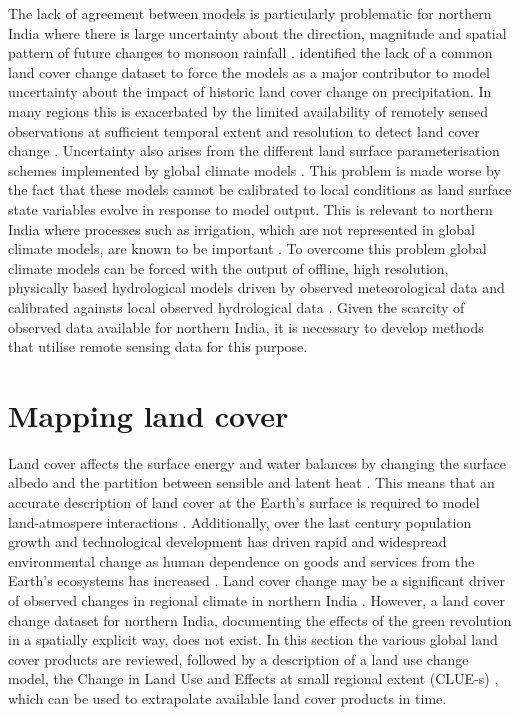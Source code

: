 \documentclass{icldt}\usepackage[]{graphicx}\usepackage[]{color}
\begin{document}
The lack of agreement between models is particularly problematic for northern India where there is large uncertainty about the direction, magnitude and spatial pattern of future changes to monsoon rainfall \citep{Goswami2006,Turner2009}. \citet{Pitman2009} identified the lack of a common land cover change dataset to force the models as a major contributor to model uncertainty about the impact of historic land cover change on precipitation. In many regions this is exacerbated by the limited availability of remotely sensed observations at sufficient temporal extent and resolution to detect land cover change \citep{Goward2006}. Uncertainty also arises from the different land surface parameterisation schemes implemented by global climate models \citep{Pitman2009}. This problem is made worse by the fact that these models cannot be calibrated to local conditions as land surface state variables evolve in response to model output. This is relevant to northern India where processes such as irrigation, which are not represented in global climate models, are known to be important \citep{Boucher2004,Gordon2005}. To overcome this problem global climate models can be forced with the output of offline, high resolution, physically based hydrological models driven by observed meteorological data and calibrated againsts local observed hydrological data \citep{Seneviratne2010}. Given the scarcity of observed data available for northern India, it is necessary to develop methods that utilise remote sensing data for this purpose. \\

%

\section{Mapping land cover}

Land cover affects the surface energy and water balances by changing the surface albedo and the partition between sensible and latent heat \citep{Sellers1997,Feddema2005}. This means that an accurate description of land cover at the Earth's surface is required to model land-atmospere interactions \citep{Friedl2002}. Additionally, over the last century population growth and technological development has driven rapid and widespread environmental change as human dependence on goods and services from the Earth's ecosystems has increased \citep{Vitousek1997}. Land cover change may be a significant driver of observed changes in regional climate in northern India \citep[e.g.][]{Goswami2006,Pitman2009,Niyogi2010}. However, a land cover change dataset for northern India, documenting the effects of the green revolution in a spatially explicit way, does not exist. In this section the various global land cover products are reviewed, followed by a description of a land use change model, the Change in Land Use and Effects at small regional extent (CLUE-s) \citep{Verburg2002,Verburg2004}, which can be used to extrapolate available land cover products in time. \\
\end{document}
